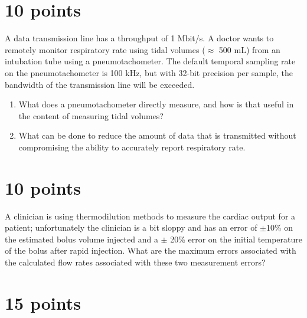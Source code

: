 \documentclass[12pt]{article}
\begin{document}
\clearpage



\clearpage



\section{10 points}

A data transmission line has a throughput of 1 Mbit/s.  A doctor wants to
remotely monitor respiratory rate using tidal volumes ($\approx$ 500 mL) from
an intubation tube using a pneumotachometer.  The default temporal sampling
rate on the pneumotachometer is 100 kHz, but with 32-bit precision per sample,
the bandwidth of the transmission line will be exceeded.  
\begin{enumerate}
    \item What does a pneumotachometer directly measure, and how is that useful in the content of measuring tidal volumes?
    \item What can be done to reduce the amount of data that is
transmitted without compromising the ability to accurately report respiratory
rate. 
\end{enumerate}

\clearpage



\clearpage



\section{10 points}

A clinician is using thermodilution methods to measure the cardiac output for a
patient; unfortunately the clinician is a bit sloppy and has an error of
$\pm$10\% on the estimated bolus volume injected and a $\pm$ 20\% error on the
initial temperature of the bolus after rapid injection.  What are the maximum
errors associated with the calculated flow rates associated with these two
measurement errors?

\clearpage



\section{15 points}
\end{document}
